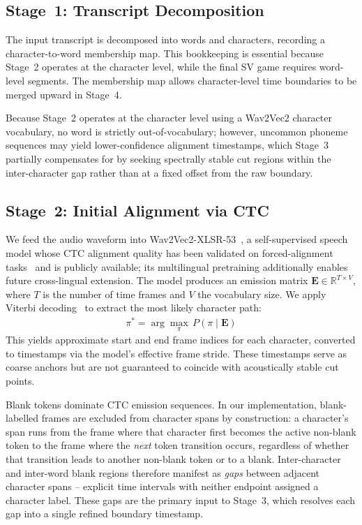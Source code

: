 \documentclass[cameraready]{Interspeech}
\begin{document}
\subsection{Stage~1: Transcript Decomposition}

The input transcript is decomposed into words and characters, recording a character-to-word membership map. This bookkeeping is essential because Stage~2 operates at the character level, while the final SV game requires word-level segments. The membership map allows character-level time boundaries to be merged upward in Stage~4.

Because Stage~2 operates at the character level using a Wav2Vec2 character vocabulary, no word is strictly out-of-vocabulary; however, uncommon phoneme sequences may yield lower-confidence alignment timestamps, which Stage~3 partially compensates for by seeking spectrally stable cut regions within the inter-character gap rather than at a fixed offset from the raw boundary.

\subsection{Stage~2: Initial Alignment via CTC}

We feed the audio waveform into Wav2Vec2-XLSR-53~\cite{conneau2020xlsr}, a  self-supervised speech model whose CTC alignment quality has been validated on  forced-alignment tasks~\cite{kurzinger2020ctc,zhu2021forced} and is publicly  available; its multilingual pretraining additionally enables future cross-lingual extension. The model produces an emission matrix $\mathbf{E} \in \mathbb{R}^{T \times V}$, where $T$ is the number of time frames and $V$ the vocabulary size. We apply Viterbi decoding~\cite{viterbi1967error} to extract the most likely character path:
%
\begin{align}
  \pi^* = \arg\max_{\pi}\, P(\pi \mid \mathbf{E})
  \label{eq:viterbi}
\end{align}
%
This yields approximate start and end frame indices for each character, converted to timestamps via the model's effective frame stride. These timestamps serve as coarse anchors but are not guaranteed to coincide with acoustically stable cut points.

Blank tokens dominate CTC emission sequences. In our implementation, blank-labelled frames are excluded from character spans by construction: a character's span runs from the frame where that character first becomes the active non-blank token to the frame where the \emph{next} token transition occurs, regardless of whether that transition leads to another non-blank token or to a blank. Inter-character and inter-word blank regions therefore manifest as \emph{gaps} between adjacent character spans -- explicit time intervals with neither endpoint assigned a character label. These gaps are the primary input to Stage~3, which resolves each gap into a single refined boundary timestamp.
\end{document}
